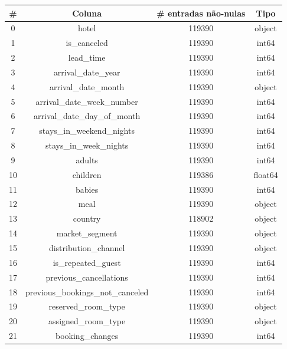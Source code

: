 \documentclass{homework}
\begin{document}
\newpage
\begin{table}[h!]
\centering
    \begin{tabular}{|c|c|c|c|}
        \hline
        \textbf{\#} & \textbf{Coluna} & \textbf{\# entradas não-nulas} & \textbf{Tipo} \\
        \hline
        0 & hotel & 119390 & object \\
        \hline
        1 & is\_canceled & 119390 & int64 \\
        \hline
        2 & lead\_time & 119390 & int64 \\
        \hline
        3 & arrival\_date\_year & 119390 & int64 \\
        \hline
        4 & arrival\_date\_month & 119390 & object \\
        \hline
        5 & arrival\_date\_week\_number & 119390 & int64 \\
        \hline
        6 & arrival\_date\_day\_of\_month & 119390 & int64 \\
        \hline
        7 & stays\_in\_weekend\_nights & 119390 & int64 \\
        \hline
        8 & stays\_in\_week\_nights & 119390 & int64 \\
        \hline
        9 & adults & 119390 & int64 \\
        \hline
        10 & children & 119386 & float64 \\
        \hline
        11 & babies & 119390 & int64 \\
        \hline
        12 & meal & 119390 & object \\
        \hline
        13 & country & 118902 & object \\
        \hline
        14 & market\_segment & 119390 & object \\
        \hline
        15 & distribution\_channel & 119390 & object \\
        \hline
        16 & is\_repeated\_guest & 119390 & int64 \\
        \hline
        17 & previous\_cancellations & 119390 & int64 \\
        \hline
        18 & previous\_bookings\_not\_canceled & 119390 & int64 \\
        \hline
        19 & reserved\_room\_type & 119390 & object \\
        \hline
        20 & assigned\_room\_type & 119390 & object \\
        \hline
        21 & booking\_changes & 119390 & int64 \\

\end{tabular}
\end{table}
\end{document}
